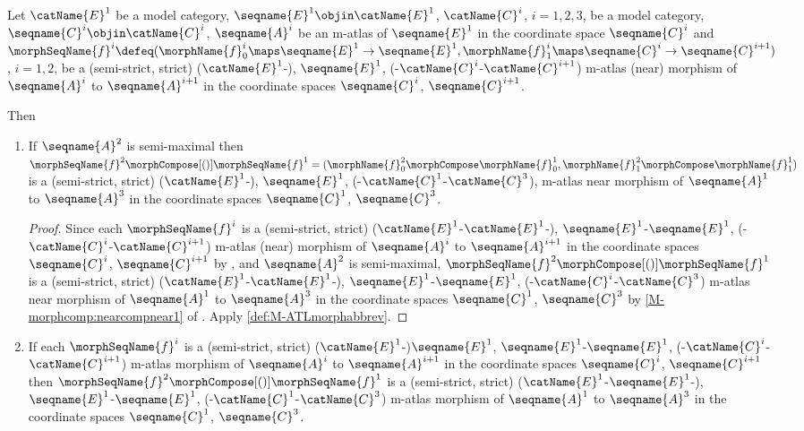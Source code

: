 \documentclass{article}
\begin{document}
\begin{corollary}
\label{cor:M-ATLmorphcomp}
Let $\catName{E}^1$ be a model category,
$\seqname{E}^1 \objin \catName{E}^1$,
$\catName{C}^i$, $i=1,2,3$, be a model category,
$\seqname{C}^i \objin \catName{C}^i$, $\seqname{A}^i$ be an m-atlas of
$\seqname{E}^1$ in the coordinate space $\seqname{C}^i$ and
$
  \morphSeqName{f}^i \defeq
    (
      \morphName{f}^i_0 \maps \seqname{E}^1 \to \seqname{E}^1,
      \morphName{f}^i_1 \maps \seqname{C}^i \to \seqname{C}^{i+1}
    )
$, $i=1,2$,
be a (semi-strict, strict)
\nobreaks
  {
    {($\catName{E}^1$-)},
    {$\seqname{E}^1$},
    {(-$\catName{C}^i$-$\catName{C}^{i+1}$)}
  }
m-atlas (near) morphism of
$\seqname{A}^i$ to $\seqname{A}^{i+1}$ in the coordinate spaces
$\seqname{C}^i$, $\seqname{C}^{i+1}$.

Then

\begin{enumerate}
\item
If $\seqname{A}^2$ is semi-maximal then
$
  \morphSeqName{f}^2 \morphCompose[()] \morphSeqName{f}^1 =
    (
      \morphName{f}^2_0 \morphCompose \morphName{f}^1_0,
      \morphName{f}^2_1 \morphCompose \morphName{f}^1_1
    )
$
is a (semi-strict, strict)
\nobreaks
  {
    {($\catName{E}^1$-)},
    {$\seqname{E}^1$},
    {(-$\catName{C}^1$-$\catName{C}^3$)},
  }
m-atlas near morphism of $\seqname{A}^1$ to $\seqname{A}^3$ in the
coordinate spaces $\seqname{C}^1$, $\seqname{C}^3$.

\begin{proof}
Since each $\morphSeqName{f}^i$ is a (semi-strict, strict)
\nobreaks
  {
    {($\catName{E}^1$-$\catName{E}^1$-)},
    {$\seqname{E}^1$-$\seqname{E}^1$},
    {(-$\catName{C}^i$-$\catName{C}^{i+1}$)}
  }
m-atlas (near) morphism of
$\seqname{A}^i$ to $\seqname{A}^{i+1}$ in the coordinate spaces
$\seqname{C}^i$, $\seqname{C}^{i+1}$ by
,
and $\seqname{A}^2$ is semi-maximal,
$\morphSeqName{f}^2 \morphCompose[()] \morphSeqName{f}^1$ is a (semi-strict,
strict)
\nobreaks
  {
    {($\catName{E}^1$-$\catName{E}^1$-)},
    {$\seqname{E}^1$-$\seqname{E}^1$},
    {(-$\catName{C}^i$-$\catName{C}^3$)}
  }
m-atlas near morphism of
$\seqname{A}^1$ to $\seqname{A}^3$ in the coordinate spaces
$\seqname{C}^1$, $\seqname{C}^3$ by \cref{M-morphcomp:nearcompnear1} of
{
  \showlabelsinline
  .
}
Apply \cref{def:M-ATLmorphabbrev}.
\end{proof}

\item
If each $\morphSeqName{f}^i$ is a (semi-strict, strict)
\nobreaks
  {
    {($\catName{E}^1$-)$\seqname{E}^1$},
    {$\seqname{E}^1$-$\seqname{E}^1$},
    {(-$\catName{C}^i$-$\catName{C}^{i+1}$)}
  }
m-atlas morphism of $\seqname{A}^i$ to $\seqname{A}^{i+1}$ in the
coordinate spaces $\seqname{C}^i$, $\seqname{C}^{i+1}$ then
$\morphSeqName{f}^2 \morphCompose[()] \morphSeqName{f}^1$ is a (semi-strict,
strict)
\nobreaks
  {
    {($\catName{E}^1$-$\seqname{E}^1$-)},
    {$\seqname{E}^1$-$\seqname{E}^1$},
    {(-$\catName{C}^1$-$\catName{C}^3$)}
  }
m-atlas morphism of $\seqname{A}^1$ to $\seqname{A}^3$ in the coordinate
spaces $\seqname{C}^1$, $\seqname{C}^3$.


\end{enumerate}
\end{corollary}
\end{document}
